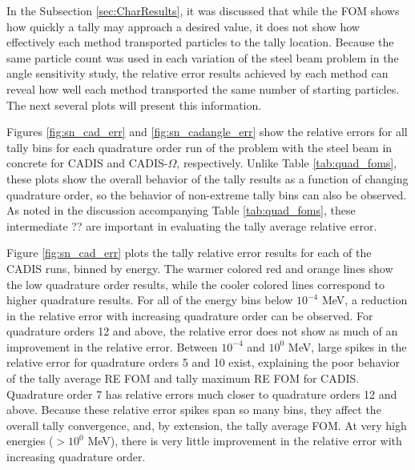 In the Subsection \ref{sec:CharResults}, it was discussed that while the FOM
shows how quickly a tally may approach a desired value, it does not show how
effectively
each method transported particles to the tally location. Because the same
particle count was used in each variation of the steel beam problem in the angle
sensitivity study, the relative error results achieved by each method can reveal
how well each method transported the same number of starting particles.
The next several plots will present
this information.

Figures \ref{fig:sn_cad_err} and \ref{fig:sn_cadangle_err} show the relative
errors for all tally bins for each quadrature order run of the problem with the
steel beam in concrete for CADIS and CADIS-$\Omega$, respectively.
Unlike Table \ref{tab:quad_foms}, these plots show the
overall behavior of the tally results as a function of changing quadrature
order, so the behavior of non-extreme tally bins can also be observed. As noted
in the discussion accompanying Table \ref{tab:quad_foms}, these intermediate ??
are important in evaluating the tally average relative error.


Figure \ref{fig:sn_cad_err} plots the tally relative error results for each of
the CADIS runs, binned by energy. The warmer colored red and orange lines show
the low quadrature order results, while the cooler colored lines correspond to
higher quadrature results. For all of the energy bins below $10^{-4}$ MeV, a
reduction in the relative error with increasing quadrature order can be
observed. For quadrature orders 12 and above, the relative error does not
show as much of an improvement in the relative error. Between $10^{-4}$ and
$10^{0}$ MeV, large spikes in the relative error for quadrature orders 5 and 10
exist, explaining the poor behavior of the tally average RE FOM and tally
maximum RE FOM for CADIS.
Quadrature order 7 has relative errors much closer to quadrature orders
12 and above. Because these relative error spikes span so many bins, they affect
the overall tally convergence, and, by extension, the tally average FOM. At very
high energies ($> 10^{0}$ MeV), there is very little improvement in the relative
error with increasing quadrature order.


